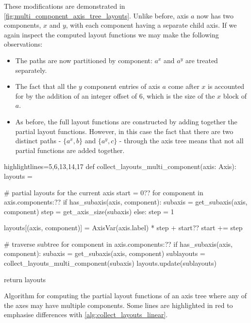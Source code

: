 \documentclass[thesis]{subfiles}
\begin{document}
These modifications are demonstrated in \cref{fig:multi_component_axis_tree_layouts}.
Unlike before, axis $a$ now has two components, $x$ and $y$, with each component having a separate child axis.
If we again inspect the computed layout functions we may make the following observations:

\begin{itemize}
  \item
    The paths are now partitioned by component: $a^x$ and $a^y$ are treated separately.

  \item
    The fact that all the $y$ component entries of axis $a$ come after $x$ is accounted for by the addition of an integer offset of 6, which is the size of the $x$ block of $a$.

  \item
    As before, the full layout functions are constructed by adding together the partial layout functions.
    However, in this case the fact that there are two distinct paths - $\{a^x, b\}$ and $\{a^y, c\}$ - through the axis tree means that not all partial functions are added together.
\end{itemize}

\begin{algorithm}
  \begin{center}
    \begin{minipage}{.9\textwidth}
      \begin{pyalg2*}{highlightlines={5,6,13,14,17}}
        def collect_layouts_multi_component(axis: Axis):
          layouts = {}

          # partial layouts for the current axis
          start = 0?\label{code:multi_component_start_var}?
          for component in axis.components:?\label{code:mc_loop1}?
            if has_subaxis(axis, component):
              subaxis = get_subaxis(axis, component)
              step = get_axis_size(subaxis)
            else:
              step = 1

            layouts[(axis, component)] = AxisVar(axis.label) * step + start?\label{code:mc_layout_store}?
            start += step

          # traverse subtree
          for component in axis.components:?\label{code:mc_loop2}?
            if has_subaxis(axis, component): 
              subaxis = get_subaxis(axis, component)
              sublayouts = collect_layouts_multi_component(subaxis)
              layouts.update(sublayouts)

          return layouts
      \end{pyalg2*}
    \end{minipage}
  \end{center}

  \caption{
    Algorithm for computing the partial layout functions of an axis tree where any of the axes may have multiple components.
    Some lines are highlighted in red to emphasise differences with \cref{alg:collect_layouts_linear}.
  }
  \label{alg:collect_layouts_multi_component}
\end{algorithm}
\end{document}
